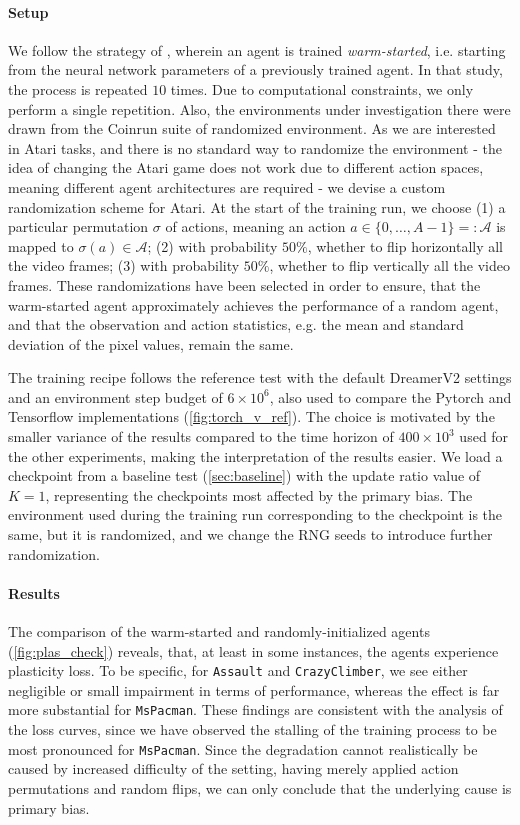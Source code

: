 \documentclass[en]{pracamgr}
\newcommand{\env}[1]{{\tt #1}}
\begin{document}
\paragraph{Setup} We follow the strategy of \autocite{julianiStudyPlasticityLoss2024}, wherein an agent is trained \emph{warm-started}, i.e. starting from the neural network parameters of a previously trained agent. In that study, the process is repeated $10$ times. Due to computational constraints, we only perform a single repetition. Also, the environments under investigation there were drawn from the Coinrun suite of randomized environment. As we are interested in Atari tasks, and there is no standard way to randomize the environment - the idea of changing the Atari game does not work due to different action spaces, meaning different agent architectures are required - we devise a custom randomization scheme for Atari. At the start of the training run, we choose (1) a particular permutation $\sigma$ of actions, meaning an action $a \in \{0, \ldots, A - 1\} =: \mathcal{A}$ is mapped to $\sigma(a) \in \mathcal{A}$; (2) with probability $50\%$, whether to flip horizontally all the video frames; (3) with probability $50\%$, whether to flip vertically all the video frames. These randomizations have been selected in order to ensure, that the warm-started agent approximately achieves the performance of a random agent, and that the observation and action statistics, e.g. the mean and standard deviation of the pixel values, remain the same.

The training recipe follows the reference test with the default DreamerV2 settings and an environment step budget of $6 \times 10^6$, also used to compare the Pytorch and Tensorflow implementations (\autoref{fig:torch_v_ref}). The choice is motivated by the smaller variance of the results compared to the time horizon of $400 \times 10^3$ used for the other experiments, making the interpretation of the results easier. We load a checkpoint from a baseline test (\autoref{sec:baseline}) with the update ratio value of $K = 1$, representing the checkpoints most affected by the primary bias. The environment used during the training run corresponding to the checkpoint is the same, but it is randomized, and we change the RNG seeds to introduce further randomization.

\paragraph{Results} The comparison of the warm-started and randomly-initialized agents (\autoref{fig:plas_check}) reveals, that, at least in some instances, the agents experience plasticity loss. To be specific, for \env{Assault} and \env{CrazyClimber}, we see either negligible or small impairment in terms of performance, whereas the effect is far more substantial for \env{MsPacman}. These findings are consistent with the analysis of the loss curves, since we have observed the stalling of the training process to be most pronounced for \env{MsPacman}. Since the degradation cannot realistically be caused by increased difficulty of the setting, having merely applied action permutations and random flips, we can only conclude that the underlying cause is primary bias.
\end{document}

